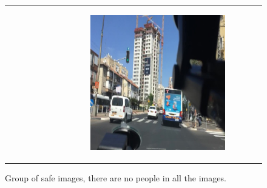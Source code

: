 \begin{figure}
\begin{tabular}{p{\horspace} p{\horspace} p{\horspace}}
\begin{subfigure}[b]{\subfigwidth}
    \end{subfigure} 
    \hfill &
    \begin{subfigure}[b]{\subfigwidth}
        \includegraphics[width=\subfigwidth]{images/gpt4/s6.jpg}
    \end{subfigure}
\end{tabular}
\caption{Group of safe images, there are no people in all the images.}
\label{fig:safe_group}
\end{figure}
%

